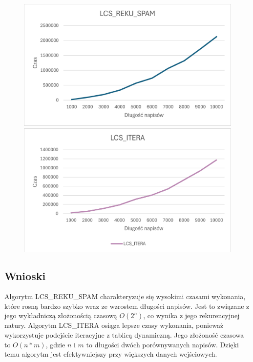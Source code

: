 \documentclass{article}
\begin{document}
	\begin{figure}[H]
		\begin{minipage}{0.5\textwidth}
			\centering
			\includegraphics[width=\textwidth]{RekuLSC.png}
		\end{minipage}%
		\begin{minipage}{0.5\textwidth}
			\centering
			\includegraphics[width=\textwidth]{IteLSC.png}
		\end{minipage}
	\end{figure}
	
	\subsection*{Wnioski} 
	Algorytm LCS\_REKU\_SPAM charakteryzuje się wysokimi czasami wykonania, które rosną bardzo szybko wraz ze wzrostem długości napisów. Jest to związane z jego wykładniczą złożonością czasową $O(2^n)$, co wynika z jego rekurencyjnej natury. Algorytm LCS\_ITERA osiąga lepsze czasy wykonania, ponieważ wykorzystuje podejście iteracyjne z tablicą dynamiczną. Jego złożoność czasowa to $O(n*m)$, gdzie $n$ i $m$ to długości dwóch porównywanych napisów. Dzięki temu algorytm jest efektywniejszy przy większych danych wejściowych.
	
\end{document}
